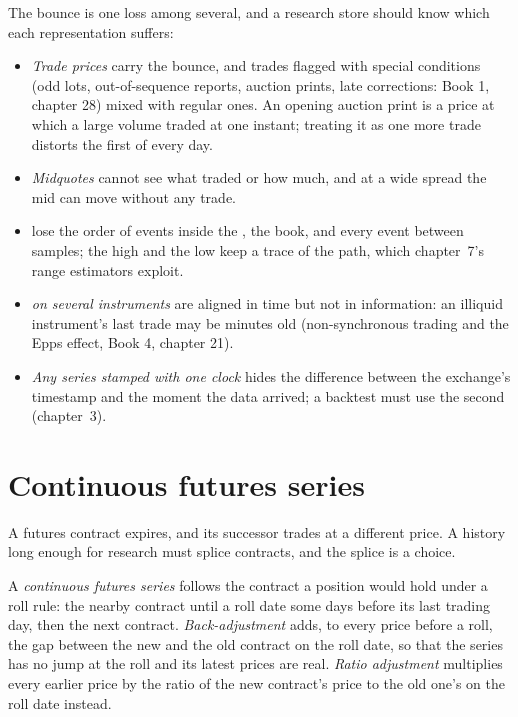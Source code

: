 The bounce is one loss among several, and a research store should know which each representation suffers:
\begin{itemize}
\item \emph{Trade prices} carry the bounce, and trades flagged with special conditions (odd lots, out-of-sequence reports,
auction prints, late corrections: Book 1, chapter 28) mixed with regular ones. An opening auction print is a price at which a
large volume traded at one instant; treating it as one more trade distorts the first  of every day.
\item \emph{Midquotes} cannot see what traded or how much, and at a wide spread the mid can move without any trade.
\item \emph{} lose the order of events inside the , the book, and every event between samples; the high and the low keep a
trace of the path, which chapter~7's range estimators exploit.
\item \emph{ on several instruments} are aligned in time but not in information: an illiquid instrument's last trade
may be minutes old (non-synchronous trading and the Epps effect, Book 4, chapter 21).
\item \emph{Any series stamped with one clock} hides the difference between the exchange's timestamp and the moment the data
arrived; a backtest must use the second (chapter~3).
\end{itemize}

\section{Continuous futures series}

A futures contract expires, and its successor trades at a different price. A history long enough for research must splice
contracts, and the splice is a choice.

\begin{definition}\label{def:rs:market-data-for-research:continuous}
A \emph{continuous futures series} follows the contract a position would hold under a roll rule:
the nearby contract until a roll date some days before its last trading day, then the next contract. \emph{Back-adjustment}
adds, to every price before a roll, the gap between the new and the old contract on the roll date, so that the series has no
jump at the roll and its latest prices are real. \emph{Ratio adjustment} multiplies every earlier price by
the ratio of the new contract's price to the old one's on the roll date instead.
\end{definition}


